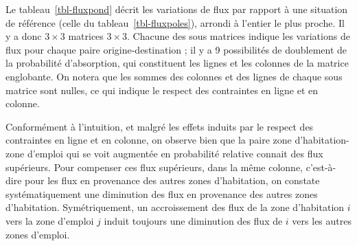 \documentclass[
  10pt,
  a4paper,
  numbers=noendperiod,
  DIV=9]{scrartcl}
\begin{document}
Le tableau~\ref{tbl-fluxpond} décrit les variations de flux par rapport
à une situation de référence (celle du tableau~\ref{tbl-fluxpoles}),
arrondi à l'entier le plus proche. Il y a donc \(3 \times 3\) matrices
\(3 \times 3\). Chacune des sous matrices indique les variations de flux
pour chaque paire origine-destination ; il y a 9 possibilités de
doublement de la probabilité d'absorption, qui constituent les lignes et
les colonnes de la matrice englobante. On notera que les sommes des
colonnes et des lignes de chaque sous matrice sont nulles, ce qui
indique le respect des contraintes en ligne et en colonne.

Conformément à l'intuition, et malgré les effets induits par le respect
des contraintes en ligne et en colonne, on observe bien que la paire
zone d'habitation-zone d'emploi qui se voit augmentée en probabilité
relative connait des flux supérieurs. Pour compenser ces flux
supérieurs, dans la même colonne, c'est-à-dire pour les flux en
provenance des autres zones d'habitation, on constate systématiquement
une diminution des flux en provenance des autres zones d'habitation.
Symétriquement, un accroissement des flux de la zone d'habitation \(i\)
vers la zone d'emploi \(j\) induit toujours une diminution des flux de
\(i\) vers les autres zones d'emploi.
\end{document}
